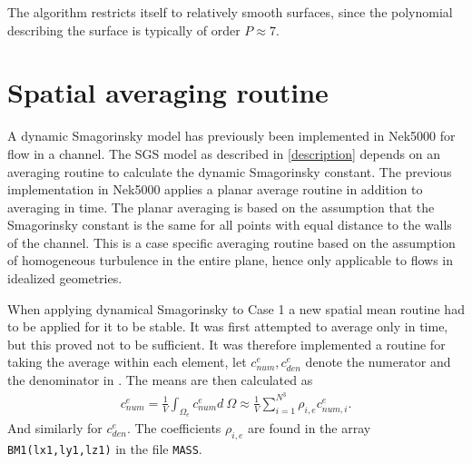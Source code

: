 %
The algorithm restricts itself to relatively smooth surfaces, since the polynomial 
describing the surface is typically of order $P \approx 7$.
%
\section{Spatial averaging routine}
A dynamic Smagorinsky model has previously been implemented in Nek5000 for flow in a channel. 
The SGS model as described in \cref{description} depends on an averaging routine to calculate
the dynamic Smagorinsky constant. The previous implementation in Nek5000 applies a planar average routine
in addition to averaging in time. The planar averaging is based on the assumption that the Smagorinsky 
constant is the same for all points with equal distance to the walls of the channel.
This is a case specific averaging routine based on the assumption of homogeneous turbulence 
in the entire plane, hence only applicable to flows in idealized geometries.

When applying dynamical Smagorinsky to Case 1 a new spatial mean routine had to be applied for it to be stable. 
It was first attempted to average only in time, but this proved not to be sufficient. It was
therefore implemented a routine for taking the average within each element, let 
$c_{num}^e,c_{den}^e$ denote the numerator and the denominator in .
The means are then calculated as 
\begin{align}
    c_{num}^e = \frac{1}{V}\int_{\Omega_e}c_{num}^e d\: \Omega 
    \approx \frac{1}{V}\sum_{i = 1}^{N^3}\rho_{i,e}c_{num,i}^{e}.
    \label{eq:averageroutine}
\end{align}
And similarly for $c_{den}^e$.
The coefficients $\rho_{i,e}$ are found in the array \verb|BM1(lx1,ly1,lz1)| in the file 
\verb|MASS|.
